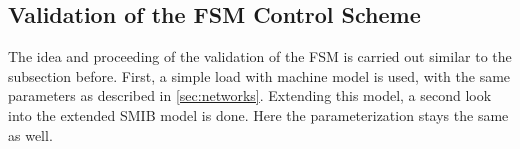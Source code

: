 



\subsection{Validation of the FSM Control Scheme}
\label{sec:validation-fsm-schemes}

The idea and proceeding of the validation of the \acs{FSM} is carried out similar to the subsection before.
First, a simple load with machine model is used, with the same  parameters as described in \autoref{sec:networks}.
Extending this model, a second look into the extended \acs{SMIB} model is done.
Here the parameterization stays the same as well.

